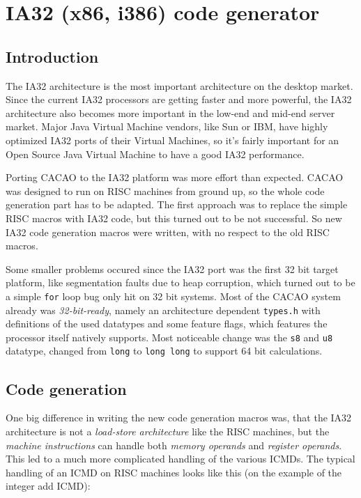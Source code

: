 \section{IA32 (x86, i386) code generator}
\label{sectionia32codegenerator}


\subsection{Introduction}

The IA32 architecture is the most important architecture on the
desktop market. Since the current IA32 processors are getting faster
and more powerful, the IA32 architecture also becomes more important
in the low-end and mid-end server market. Major Java Virtual Machine
vendors, like Sun or IBM, have highly optimized IA32 ports of their
Virtual Machines, so it's fairly important for an Open Source Java
Virtual Machine to have a good IA32 performance.

Porting CACAO to the IA32 platform was more effort than
expected. CACAO was designed to run on RISC machines from ground up,
so the whole code generation part has to be adapted. The first
approach was to replace the simple RISC macros with IA32 code, but
this turned out to be not successful. So new IA32 code generation
macros were written, with no respect to the old RISC macros.

Some smaller problems occured since the IA32 port was the first 32 bit
target platform, like segmentation faults due to heap corruption,
which turned out to be a simple \texttt{for} loop bug only hit on 32
bit systems. Most of the CACAO system already was
\textit{32-bit-ready}, namely an architecture dependent
\texttt{types.h} with definitions of the used datatypes and some
feature flags, which features the processor itself natively
supports. Most noticeable change was the \texttt{s8} and \texttt{u8}
datatype, changed from \texttt{long} to \texttt{long long} to support
64 bit calculations.


\subsection{Code generation}

One big difference in writing the new code generation macros was, that
the IA32 architecture is not a \textit{load-store architecture} like
the RISC machines, but the \textit{machine instructions} can handle
both \textit{memory operands} and \textit{register operands}. This led
to a much more complicated handling of the various ICMDs. The typical
handling of an ICMD on RISC machines looks like this (on the example
of the integer add ICMD):

